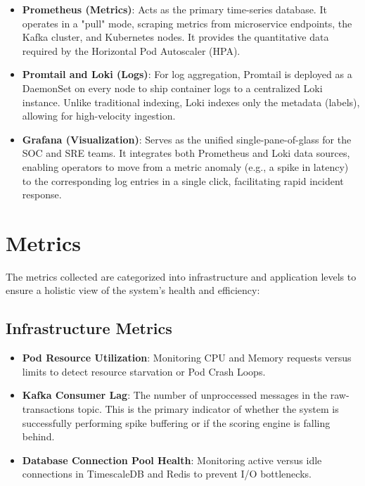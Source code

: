 \documentclass[12pt]{report}
\begin{document}
\begin{itemize}
    \item \textbf{Prometheus (Metrics)}: Acts as the primary time-series database. It operates in a "pull" mode, scraping metrics from microservice endpoints, the Kafka cluster, and Kubernetes nodes. It provides the quantitative data required by the Horizontal Pod Autoscaler (HPA).
    
    \item \textbf{Promtail and Loki (Logs)}: For log aggregation, Promtail is deployed as a DaemonSet on every node to ship container logs to a centralized Loki instance. Unlike traditional indexing, Loki indexes only the metadata (labels), allowing for high-velocity ingestion.
    
    \item \textbf{Grafana (Visualization)}: Serves as the unified single-pane-of-glass for the SOC and SRE teams. It integrates both Prometheus and Loki data sources, enabling operators to move from a metric anomaly (e.g., a spike in latency) to the corresponding log entries in a single click, facilitating rapid incident response.
\end{itemize}

\section{Metrics}
The metrics collected are categorized into infrastructure and application levels to ensure a holistic view of the system's health and efficiency:

\subsection{Infrastructure Metrics}
\begin{itemize}
    \item \textbf{Pod Resource Utilization}: Monitoring CPU and Memory requests versus limits to detect resource starvation or Pod Crash Loops.
    
    \item \textbf{Kafka Consumer Lag}: The number of unproccessed messages in the raw-transactions topic. This is the primary indicator of whether the system is successfully performing spike buffering or if the scoring engine is falling behind.

    \item \textbf{Database Connection Pool Health}: Monitoring active versus idle connections in TimescaleDB and Redis to prevent I/O bottlenecks.
\end{itemize}
\end{document}
